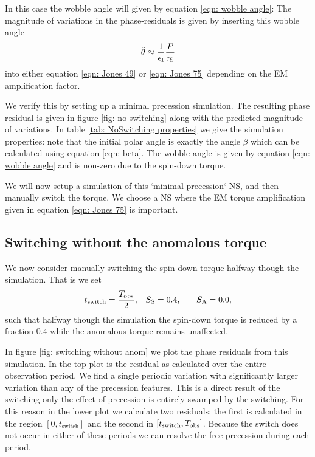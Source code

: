 \documentclass[../full_thesis/full_thesis.tex]{subfiles}
\newcommand{\thisdir}{../inertial_frame}
\begin{document}
In this case the wobble angle will given by equation \eqref{eqn: wobble angle}:
The magnitude of variations in the phase-residuals is given by inserting this
wobble angle
\begin{equation}
\tilde{\theta} \approx \frac{1}{\epsilon_{\mathrm{I}}}{\frac{P}{\tau_{\mathrm{S}}}}
\end{equation} 
into either equation \eqref{eqn: Jones 49} or \eqref{eqn: Jones 75} depending 
on the EM amplification factor.

We verify this by setting up a minimal precession simulation. The resulting
phase residual is given in figure \ref{fig: no switching} along with the
predicted magnitude of variations. In table \ref{tab: NoSwitching properties}
we give the simulation properties: note that the initial polar angle is exactly
the angle $\beta$ which can be calculated using equation \eqref{eqn: beta}. 
The wobble angle is given by equation \eqref{eqn: wobble angle} and is non-zero
due to the spin-down torque. 

\begin{figure}[htb]
\begin{floatrow}
\capbtabbox{%
  
}{%
  \caption{}%
  \label{tab: NoSwitching properties}
}
\end{floatrow}
\end{figure}


We will now setup a simulation of this `minimal precession` NS, and then 
manually switch the torque. We choose a NS where the EM torque amplification
given in equation \eqref{eqn: Jones 75} is important.

\subsection{Switching without the anomalous torque}
We now consider manually switching the spin-down torque halfway though the simulation.
That is we set
\begin{align}
    t_{\mathrm{switch}} = \frac{T_{\textrm{obs}}}{2}, &&& S_{\mathrm{S}} = 0.4, &&& S_{\mathrm{A}} = 0.0,
\end{align}
such that halfway though the simulation the spin-down torque is reduced by a
fraction $0.4$ while the anomalous torque remains unaffected. 

In figure \ref{fig: switching without anom} we plot the phase residuals from
this simulation. In the top plot is the residual as calculated over the entire
observation period. We find a single periodic variation with significantly
larger variation than any of the precession features. This is a direct result
of the switching only%
the
effect of precession is entirely swamped by the switching. For this reason in
the lower plot we calculate two residuals: the first is calculated
in the region $[0, t_{\mathrm{switch}}]$ and the second in $[t_{\mathrm{switch}}, T_{\textrm{obs}}]$.
Because the switch does not occur in either of these periods we can resolve the
free precession during each period.
\end{document}
